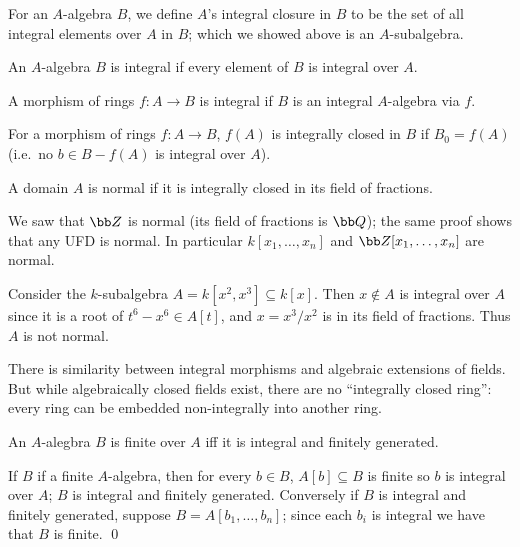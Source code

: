 \eproof

\bdefn

    \benum
        \item For an $A$-algebra $B$, we define $A$'s {\emphcolor integral closure} in $B$ to be the set of all integral elements over $A$ in $B$; which we showed above is an $A$-subalgebra.
        \item An $A$-algebra $B$ is {\emphcolor integral} if every element of $B$ is integral over $A$.
        \item A morphism of rings $f\colon A\to B$ is {\emphcolor integral} if $B$ is an integral $A$-algebra via $f$.
        \item For a morphism of rings $f\colon A\to B$, $f(A)$ is {\emphcolor integrally closed} in $B$ if $B_0=f(A)$ (i.e.\ no $b\in B-f(A)$ is integral over $A$).
        \item A domain $A$ is {\emphcolor normal} if it is integrally closed in its field of fractions.
    \eenum

\edefn

\bexam

    We saw that $\bZ$ is normal (its field of fractions is $\bQ$); the same proof shows that any UFD is normal.
    In particular $k[x_1,\dots,x_n]$ and $\bZ[x_1,\dots,x_n]$ are normal.

    Consider the $k$-subalgebra $A=k[x^2,x^3]\subseteq k[x]$.
    Then $x\notin A$ is integral over $A$ since it is a root of $t^6-x^6\in A[t]$, and $x=x^3/x^2$ is in its field of fractions.
    Thus $A$ is not normal.

\eexam

\bnote

    There is similarity between integral morphisms and algebraic extensions of fields.
    But while algebraically closed fields exist, there are no ``integrally closed ring'': every ring can be embedded non-integrally into another ring.

\enote

\bcoro

    An $A$-alegbra $B$ is finite over $A$ iff it is integral and finitely generated.

\ecoro

\bproof

    If $B$ if a finite $A$-algebra, then for every $b\in B$, $A[b]\subseteq B$ is finite so $b$ is integral over $A$; $B$ is integral and finitely generated.
    Conversely if $B$ is integral and finitely generated, suppose $B=A[b_1,\dots,b_n]$; since each $b_i$ is integral we have that $B$ is finite.
    \qed


